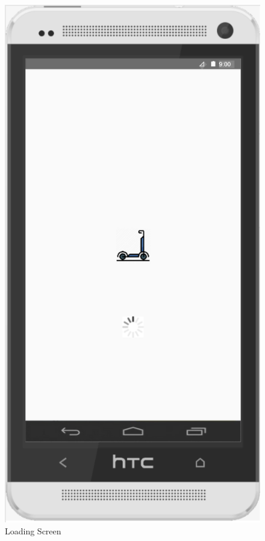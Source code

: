 \documentclass[a4paper, 12pt]{article}
\begin{document}
\begin{figure} [htbp]
  \begin{center}
    \includegraphics[scale=0.75]{images/prototypes/06-loading-screen.png}
  \end{center}
  \caption{Loading Screen}
\end{figure}
\end{document}
